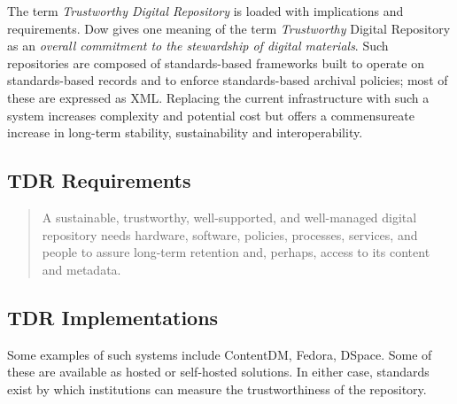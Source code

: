 The term \emph{Trustworthy Digital Repository} is loaded with implications and requirements. Dow gives one meaning of the term \emph{Trustworthy} Digital Repository as an \emph{overall commitment to the stewardship of digital materials}\cite{dow_elizabeth_2009}. Such repositories are composed of standards-based frameworks built to operate on standards-based records and to enforce standards-based archival policies; most of these are expressed as XML. Replacing the current infrastructure with such a system increases complexity and potential cost but offers a commensureate increase in long-term stability, sustainability and interoperability. 
\subsection{TDR Requirements}
\begin{quote}A sustainable, trustworthy, well-supported, and well-managed digital repository needs hardware, software, policies, processes, services, and people to assure long-term retention and, perhaps, access to its content and metadata.\cite{dow_elizabeth_2009} \end{quote}

\subsection{TDR Implementations}
Some examples of such systems include ContentDM, Fedora, DSpace. Some of these are available as hosted or self-hosted solutions. In either case, standards exist  by which institutions can measure the trustworthiness of the repository.